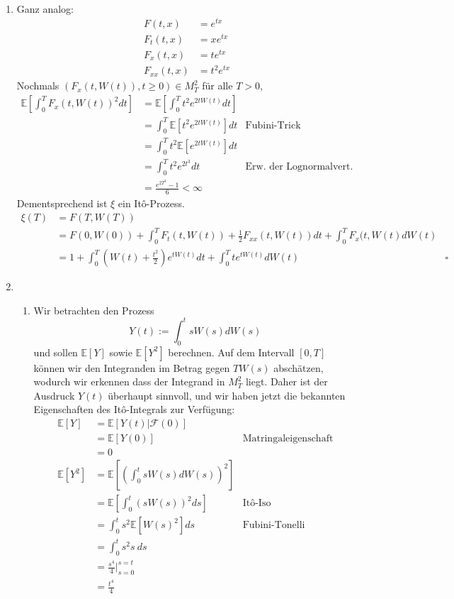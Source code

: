 \documentclass[a4paper,11pt,notitlepage,fullpage]{article}
\newcommand{\Ee}[1]{\mathbb E\left[#1\right]}
\newcommand{\F}{\mathcal{F}}
\begin{document}
\begin{enumerate}
\item Ganz analog:
\begin{align*}
F(t, x) &= e^{tx} \\
F_t(t, x) &= x e^{tx} \\
F_x(t, x) &= t e^{tx} \\
F_{xx}(t, x) &= t^2 e^{tx}
\end{align*}
Nochmals $(F_x(t, W(t)), t \geq 0) \in M_T^2$ für alle $T > 0$, 
\begin{align*}
\Ee{ \int_0^T F_x(t, W(t))^2 dt} &= \Ee{ \int_0^T t^2 e^{2tW(t)} dt} \\
&= \int_0^T \Ee{ t^2 e^{2tW(t)}} dt &\text{Fubini-Trick} \\
&= \int_0^T  t^2 \Ee{ e^{2tW(t)}} dt \\
&= \int_0^T  t^2 e^{2t^3} dt &\text{Erw. der Lognormalvert.}\\
&= \frac{e^{2T^3} - 1}{6} < \infty
\end{align*}
Dementsprechend ist $\xi$ ein Itô-Prozess.
\begin{align*}
\xi(T) &= F(T, W(T)) \\
&= F(0, W(0)) + \int_0^T F_t(t, W(t)) + \frac{1}{2} F_{xx}(t, W(t)) dt + \int_0^T F_x(t, W(t) dW(t) \\
&= 1 + \int_0^T (W(t) + \frac{t^2}{2}) e^{tW(t)} dt + \int_0^T t e^{tW(t)} dW(t)&\square
\end{align*}

\item
\begin{enumerate}
\item Wir betrachten den Prozess
$$Y(t) := \int_0^t s W(s) dW(s)$$
und sollen $\Ee{Y}$ sowie $\Ee{Y^2}$ berechnen. Auf dem Intervall $[0,T]$ können wir den Integranden im Betrag gegen $TW(s)$ abschätzen, wodurch wir erkennen dass der Integrand in $M_T^2$ liegt. Daher ist der Ausdruck $Y(t)$ überhaupt sinnvoll, und wir haben jetzt die bekannten Eigenschaften des Itô-Integrals zur Verfügung:
\begin{align*}
\Ee{Y} &= \Ee{Y(t) | \F(0)}\\
&= \Ee{Y(0)} &\text{Matringaleigenschaft}\\
&= 0\\
\Ee{Y^2} &= \Ee{\left(\int_0^t s W(s) dW(s)\right)^2}\\
&= \Ee{\int_0^t \left(s W(s)\right)^2 ds} &\text{Itô-Iso}\\
&= \int_0^t s^2 \Ee{W(s)^2} ds &\text{Fubini-Tonelli}\\
&= \int_0^t s^2 s ~ds \\
&= \frac{s^4}{4} \bigg|_{s=0}^{s=t}\\
&= \frac{t^4}{4}
\end{align*}


\end{enumerate}
\end{enumerate}
\end{document}
